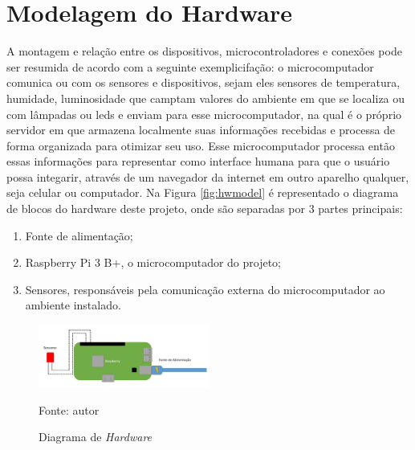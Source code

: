 \documentclass[../../layout.tex]{subfiles}
\begin{document}
\chapter{Modelagem do Hardware}
\hspace*{3em}A montagem e relação entre os dispositivos, microcontroladores e conexões pode ser resumida de acordo com a seguinte exemplicifação: o microcomputador comunica ou com os sensores e dispositivos, sejam eles sensores de temperatura, humidade, luminosidade que camptam valores do ambiente em que se localiza ou com lâmpadas ou leds e enviam para esse microcomputador, na qual é o próprio servidor em que armazena localmente suas informações recebidas e processa de forma organizada para otimizar seu uso. Esse microcomputador processa então essas informações para representar como interface humana para que o usuário possa integarir, através de um navegador da internet em outro aparelho qualquer, seja celular ou computador. Na Figura \ref{fig:hwmodel} é representado o diagrama de blocos do hardware deste projeto, onde são separadas por 3 partes principais:

\begin{enumerate}[label=\alph*)]
\itemsep0em
    \item Fonte de alimentação; 
    \item Raspberry Pi 3 B+, o microcomputador do projeto;
    \item Sensores, responsáveis pela comunicação externa do microcomputador ao ambiente instalado.
\end{enumerate}
 
\begin{figure}[H]
\centering
\caption{Diagrama de \emph{Hardware}}
\includegraphics[width=0.5\textwidth]{assets/static/img/hwmodel.jpg}
\label{fig:i2c_structure}

\begin{minipage}{0.5\textwidth}
\raggedright \footnotesize Fonte: autor 
\end{minipage}
\end{figure}
\end{document}
